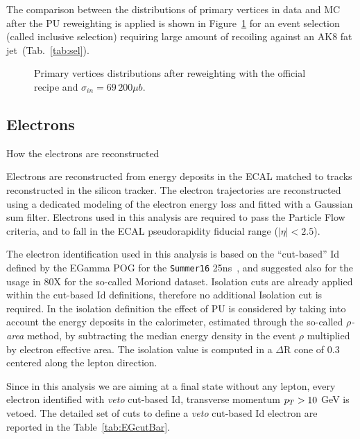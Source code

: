The comparison between the distributions of primary vertices in data and MC after the PU reweighting is applied is shown in Figure~\ref{fig:npv} for an event selection (called inclusive selection) requiring large amount of \met recoiling against an AK8 fat jet~(Tab.~\ref{tab:sel}).
 
 \begin{figure}[!htb]
  \centering
  \caption{Primary vertices distributions after reweighting with the official recipe and $\sigma_{in}=69\,200 \mu b$.}
  \label{fig:npv}
 \end{figure}


\subsection{Electrons}\label{ssec:electrons}
{\color{red} How the electrons are reconstructed}

Electrons are reconstructed from energy deposits in the ECAL matched to tracks reconstructed in the silicon tracker. 
The electron trajectories are reconstructed using a dedicated modeling of the electron energy loss and fitted with a Gaussian sum filter.
Electrons used in this analysis are required to pass the Particle Flow criteria, and to fall in the ECAL pseudorapidity fiducial range ($|\eta|<2.5$). 

The electron identification used in this analysis is based on the ``cut-based'' Id defined by the EGamma POG for the \texttt{Summer16} 25ns~\cite{EGammaPOG_ele}, and suggested also for the usage in 80X for the so-called Moriond dataset.
Isolation cuts are already applied within the cut-based Id definitions, therefore no additional Isolation cut is required.
In the isolation definition the effect of PU is considered by taking into account the energy deposits in the calorimeter, estimated through the so-called \emph{$\rho$-area} method, by subtracting the median energy density in the event $\rho$ multiplied by electron effective area.
The isolation value is computed in a $\Delta$R cone of 0.3 centered along the lepton direction.

Since in this analysis we are aiming at a final state without any lepton, every electron identified with \emph{veto} cut-based Id, transverse momentum $p_T > 10$ GeV is vetoed. The detailed set of cuts to define a \emph{veto} cut-based Id electron are reported in the Table~\ref{tab:EGcutBar}.

